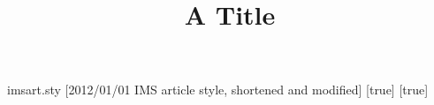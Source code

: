\begin{filecontents*}{imsart.sty}
[2012/01/01 IMS article style, shortened and modified]
\RequirePackage{keyval}
\newif\if@addressatend \@addressatendtrue
{}[true]{\def\ead@type{email}}
[true]{\def\ead@type{url}}
\def\ead@url{url}
\DeclareRobustCommand\ead[2][label= ,email]{{\def\ead@type{email}\setkeys{ead}{#1}%
  \expandafter\gdef\csname ead@a@\ead@label\endcsname{#2}%
  \expandafter\global\expandafter\let\csname ead@t@\ead@label\endcsname\ead@type}}
\def\printead#1{\expandafter\ifx\csname ead@t@#1\endcsname\ead@url url: \else e-mail: \fi
  {\ttfamily\csname ead@a@#1\endcsname}}
\newenvironment{aug}{}{\par}
\newenvironment{frontmatter}{\begin{center}}{\end{center}}
\def\author{\@ifnextchar[{\author@fmt}{\author@fmt[]}}
\def\author@fmt[#1]#2{\bgroup\def\fnms##1{##1}\def\snm##1{##1}\noindent#2\egroup}
\newcount\c@address
\def\address{\@ifnextchar[{\address@fmt}{\address@fmt[default]}}
\def\address@fmt[#1]#2{\global\advance\c@address1
  \expandafter\gdef\csname @address@\the\c@address\endcsname{#2}}
\newcount\addr@n
\def\printaddresses{\addr@n=0
  \loop\ifnum\addr@n<\c@address\global\advance\addr@n1
    \par\noindent\begin{tabular}[t]{@{}l@{}}\csname @address@\the\addr@n\endcsname\end{tabular}\repeat\par}
\let\old@enddocument\enddocument
\def\enddocument{\printaddresses\old@enddocument}
\end{filecontents*}
\documentclass{article}
\usepackage{imsart}

\begin{frontmatter}
\title{A Title}
\begin{aug}
\author{ }
\end{aug}
\end{frontmatter}
\address{Ann Able\\ Univ A\\ \\ }
Body.

